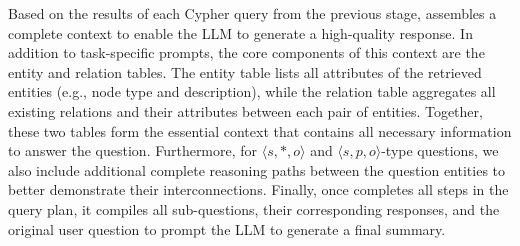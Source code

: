  Based on the results of each Cypher query from the previous stage, \name{} assembles a complete context to enable the LLM to generate a high-quality response. In addition to task-specific prompts, the core components of this context are the entity and relation tables. The entity table lists all attributes of the retrieved entities (e.g., node type and description), while the relation table aggregates all existing relations and their attributes between each pair of entities. Together, these two tables form the essential context that contains all necessary information to answer the question. Furthermore, for $\langle s, *, o \rangle$ and $\langle s, p, o \rangle$-type questions, we also include additional complete reasoning paths between the question entities to better demonstrate their interconnections. Finally, once \name{} completes all steps in the query plan, it compiles all sub-questions, their corresponding responses, and the original user question to prompt the LLM to generate a final summary.






